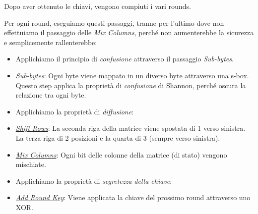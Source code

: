 


\textsf{\small Dopo aver ottenuto le chiavi, vengono compiuti i vari rounds.} 

\textsf{\small Per ogni round, eseguiamo questi passaggi, tranne per l'ultimo dove non effettuiamo il passaggio delle \emph{Mix Columns}, perché non aumenterebbe la sicurezza e semplicemente rallenterebbe: } %

\begin{itemize}
	\item[] \textsf{\small Applichiamo il principio di \emph{confusione} attraverso il passaggio \emph{Sub-bytes}.}
	\item \textsf{\small \underline{\emph{Sub-bytes}}: Ogni byte viene mappato in un diverso byte attraverso una s-box. Questo step applica la proprietà di \emph{confusione} di Shannon, perché oscura la relazione tra ogni byte.}
	\item[] \textsf{\small Applichiamo la proprietà di \emph{diffusione}:}
	\item \textsf{\small \underline{\emph{Shift Rows}}: La seconda riga della matrice viene spostata di 1 verso sinistra. La terza riga di 2 posizioni e la quarta di 3 (sempre verso sinistra).}
	\item \textsf{\small \underline{\emph{Mix Columns}}: Ogni bit delle colonne della matrice (di stato) vengono mischiate.} %
	\item[] \textsf{\small Applichiamo la proprietà di \emph{segretezza della chiave}:}
	\item \textsf{\small \underline{\emph{Add Round Key}}: Viene applicata la chiave del prossimo round attraverso uno XOR.} %
\end{itemize}

